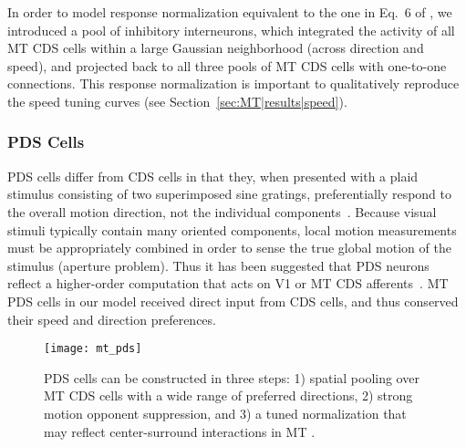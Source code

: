 In order to model response normalization equivalent to the
one in Eq.~$6$ of \cite{SimoncelliHeeger1998}, we introduced
a pool of inhibitory interneurons, which integrated the
activity of all \ac{MT} \ac{CDS} cells within a large Gaussian neighborhood
(across direction and speed), and projected back to all
three pools of \ac{MT} \ac{CDS} cells with one-to-one connections.
This response normalization is important to qualitatively reproduce
the speed tuning curves (see Section~\ref{sec:MT|results|speed}).


\subsubsection{\acf{PDS} Cells}
\label{sec:MT|PDS}
\acf{PDS} cells differ from \ac{CDS} cells in that they, 
when presented with a plaid stimulus
consisting of two superimposed sine gratings, preferentially
respond to the overall motion direction, not the individual
components~\citep{Movshon1985}. Because visual stimuli
typically contain many oriented components, local motion
measurements must be appropriately combined in order to
sense the true global motion of the stimulus (aperture problem).
Thus it has been suggested that \ac{PDS} neurons reflect a
higher-order computation that acts on \ac{V1} or \ac{MT} \ac{CDS} 
afferents~\citep{Movshon1985}. \ac{MT} \ac{PDS} cells in our model
received direct input from \ac{CDS} cells, and thus conserved their
speed and direction preferences.

\begin{figure}[t]
  \centering
  \texttt{[image: mt\_pds]}
  \caption{
  \ac{PDS} cells can be constructed in three steps:  
  1) spatial pooling over \ac{MT} \ac{CDS} cells with a wide range of 
  preferred directions, 2) strong motion opponent suppression, and
  3) a tuned normalization that may reflect center-surround interactions
  in \ac{MT} \citep{Rust2006}.}
  \label{fig:MT|PDS}
\end{figure}

